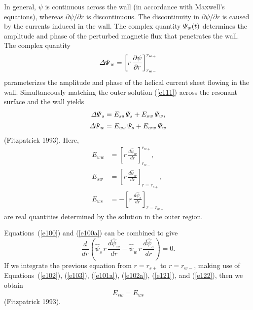 \documentclass[notitlepage,12pt]{article}
\begin{document}
{In general, $\psi$ is continuous across the wall (in accordance with Maxwell's equations), whereas $\partial\psi/\partial r$ is discontinuous. The discontinuity in $\partial\psi/\partial r$ is caused by the currents induced in the wall. The complex quantity ${\mit\Psi}_w(t)$ determines the amplitude and
phase of the perturbed magnetic flux that penetrates the wall. The complex quantity
\begin{equation}\label{e118}
{\mit\Delta\Psi}_w = \left[r\,\frac{\partial\psi}{\partial r}\right]_{r_{w-}}^{r_{w+}}
\end{equation}
parameterizes the amplitude and phase of the helical current sheet flowing in the wall.
Simultaneously matching the outer solution (\ref{e111}) across the resonant surface and the wall yields
\begin{align}
{\mit\Delta\Psi}_s &= E_{ss}\,{\mit\Psi}_s + E_{sw}\,{\mit\Psi}_w,\\[0.5ex]
{\mit\Delta\Psi}_w &= E_{ws}\,{\mit\Psi}_s+ E_{ww}\,{\mit\Psi}_w
\end{align}
(Fitzpatrick 1993).
Here,
\begin{align}
E_{ww}&= \left[r\,\frac{d\hat{\psi}_w}{dr}\right]_{r_{w-}}^{r_{w+}},\\[0.5ex]
E_{sw} &=\left[r\,\frac{{d\hat\psi}_w}{dr}\right]_{r=r_{s+}},\label{e121}\\[0.5ex]
E_{ws} &=-\left[r\,\frac{{d\hat\psi}_s}{dr}\right]_{r=r_{w-}}\label{e122}
\end{align}
are real quantities determined by the solution in the outer region.

Equations~(\ref{e100}) and (\ref{e100a}) can be combined to give
\begin{equation}
\frac{d}{dr}\!\left(\hat{\psi}_s\,r\,\frac{d\hat{\psi}_w}{dr} - \hat{\psi}_w\,r\,\frac{d\hat{\psi}_s}{dr}\right) = 0.
\end{equation}
If we integrate the previous equation from $r=r_{s+}$ to $r=r_{w-}$, making use of Equations~(\ref{e102}), (\ref{e103}), (\ref{e101a}), (\ref{e102a}), (\ref{e121}),
and (\ref{e122}), then we obtain
\begin{equation}\label{e123}
E_{sw} = E_{ws}
\end{equation}
(Fitzpatrick 1993). 

}
\end{document}
